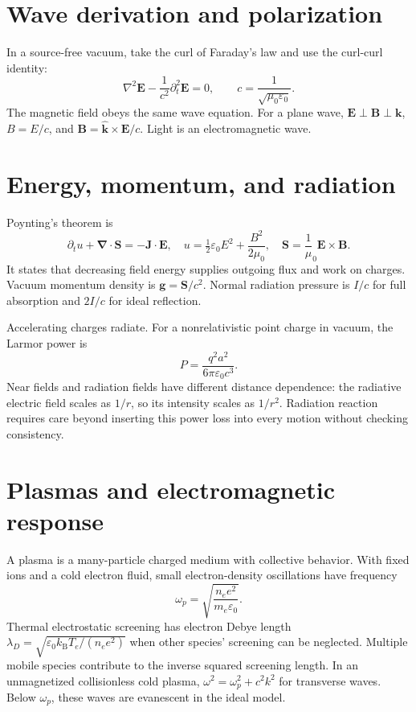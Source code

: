 \documentclass[11pt,oneside]{book}
\newcommand{\vect}[1]{\boldsymbol{#1}}
\newcommand{\grad}{\boldsymbol{\nabla}}
\newcommand{\lap}{\nabla^2}
\newcommand{\kb}{k_{\mathrm B}}
\newcommand{\eps}{\varepsilon_0}
\newcommand{\mun}{\mu_0}
\theoremstyle{reviewstyle}
\begin{document}
\section{Wave derivation and polarization}
In a source-free vacuum, take the curl of Faraday's law and use the curl-curl identity:
\begin{equation}\lap\vect E-\frac1{c^2}\partial_t^2\vect E=0,\qquad c=\frac1{\sqrt{\mun\eps}}.\end{equation}
The magnetic field obeys the same wave equation. For a plane wave, $\vect E\perp\vect B\perp\vect k$, $B=E/c$, and
$\vect B=\hat{\vect k}\times\vect E/c$. Light is an electromagnetic wave.
\section{Energy, momentum, and radiation}
Poynting's theorem is
\begin{equation}
\partial_tu+\grad\cdot\vect S=-\vect J\cdot\vect E,
\quad u=\tfrac12\eps E^2+\frac{B^2}{2\mun},\quad
\vect S=\frac1\mun\vect E\times\vect B.
\end{equation}
It states that decreasing field energy supplies outgoing flux and work on charges. Vacuum momentum density is $\vect g=\vect S/c^2$. Normal radiation pressure is $I/c$ for full absorption and $2I/c$ for ideal reflection.

Accelerating charges radiate. For a nonrelativistic point charge in vacuum, the Larmor power is
\begin{equation}P=\frac{q^2a^2}{6\pi\eps c^3}.\end{equation}
Near fields and radiation fields have different distance dependence: the radiative electric field scales as $1/r$, so its intensity scales as $1/r^2$. Radiation reaction requires care beyond inserting this power loss into every motion without checking consistency.
\section{Plasmas and electromagnetic response}
A plasma is a many-particle charged medium with collective behavior. With fixed ions and a cold electron fluid, small electron-density oscillations have frequency
\begin{equation}\omega_p=\sqrt{\frac{n_ee^2}{m_e\eps}}.\end{equation}
Thermal electrostatic screening has electron Debye length
$\lambda_D=\sqrt{\eps\kb T_e/(n_ee^2)}$ when other species' screening can be neglected. Multiple mobile species contribute to the inverse squared screening length. In an unmagnetized collisionless cold plasma,
$\omega^2=\omega_p^2+c^2k^2$ for transverse waves. Below $\omega_p$, these waves are evanescent in the ideal model.
\end{document}
